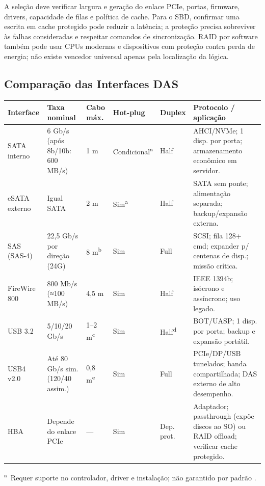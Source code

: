 \documentclass[titlepage]{article}
\begin{document}
A seleção deve verificar largura e geração do enlace PCIe, portas, firmware, drivers, capacidade de filas e política de cache. Para o SBD, confirmar uma escrita em cache protegido pode reduzir a latência; a proteção precisa sobreviver às falhas consideradas e respeitar comandos de sincronização. RAID por software também pode usar CPUs modernas e dispositivos com proteção contra perda de energia; não existe vencedor universal apenas pela localização da lógica.

\subsection{Comparação das Interfaces DAS}
\begin{table}[htbp]
\centering\footnotesize
\begin{tabularx}{\textwidth}{p{}p{}p{}p{}p{}X}
\toprule
Interface & Taxa nominal & Cabo máx. & Hot-plug & Duplex & Protocolo / aplicação \\
\midrule
SATA interno & 6 Gb/s (após 8b/10b: 600 MB/s) & 1 m & Condicional\textsuperscript{a} & Half & AHCI/NVMe; 1 disp. por porta; armazenamento econômico em servidor. \\
eSATA externo & Igual SATA & 2 m & Sim\textsuperscript{a} & Half & SATA sem ponte; alimentação separada; backup/expansão externa. \\
SAS (SAS-4) & 22,5 Gb/s por direção (24G) & 8 m\textsuperscript{b} & Sim & Full & SCSI; fila 128+ cmd; expander p/ centenas de disp.; missão crítica. \\
FireWire 800 & 800 Mb/s (≈100 MB/s) & 4,5 m & Sim & Half & IEEE 1394b; isócrono e assíncrono; uso legado. \\
USB 3.2 & 5/10/20 Gb/s & 1--2 m\textsuperscript{c} & Sim & Half\textsuperscript{d} & BOT/UASP; 1 disp. por porta; backup e expansão portátil. \\
USB4 v2.0 & Até 80 Gb/s sim. (120/40 assim.) & 0,8 m\textsuperscript{e} & Sim & Full & PCIe/DP/USB tunelados; banda compartilhada; DAS externo de alto desempenho. \\
HBA & Depende do enlace PCIe & --- & Sim & Dep. prot. & Adaptador; passthrough (expõe discos ao SO) ou RAID offload; verificar cache protegido. \\
\bottomrule
\end{tabularx}
\smallskip
\noindent\textsuperscript{a}~Requer suporte no controlador, driver e instalação; não garantido por padrão \cite{sata_cable_spec,intel_ahci}.\quad

\end{table}
\end{document}
